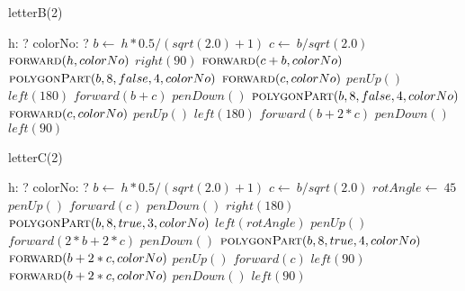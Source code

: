 \documentclass[a4paper,10pt]{article}
\begin{document}
\begin{algorithm}
\caption{letterB(2)}
\begin{algorithmic}[5]
\State {}
\State {}
    \State h: ?
    \State colorNo: ?
  \EndDecl
  \State \(b\gets\ h*0.5/(sqrt(2.0)+1)\)
  \State \(c\gets\ b/sqrt(2.0)\)
  \State \(\Call{forward}{h,colorNo}\)
  \State \(right(90)\)
  \State \(\Call{forward}{c+b,colorNo}\)
  \State \(\Call{polygonPart}{b,8,false,4,colorNo}\)
  \State \(\Call{forward}{c,colorNo}\)
  \State \(penUp()\)
  \State \(left(180)\)
  \State \(forward(b+c)\)
  \State \(penDown()\)
  \State \(\Call{polygonPart}{b,8,false,4,colorNo}\)
  \State \(\Call{forward}{c,colorNo}\)
  \State \(penUp()\)
  \State \(left(180)\)
  \State \(forward(b+2*c)\)
  \State \(penDown()\)
  \State \(left(90)\)
\EndProcedure
\end{algorithmic}
\end{algorithm}


\begin{algorithm}
\caption{letterC(2)}
\begin{algorithmic}[5]
\State {}
\State {}
    \State h: ?
    \State colorNo: ?
  \EndDecl
  \State \(b\gets\ h*0.5/(sqrt(2.0)+1)\)
  \State \(c\gets\ b/sqrt(2.0)\)
  \State \(rotAngle\gets\ 45\)
  \State \(penUp()\)
  \State \(forward(c)\)
  \State \(penDown()\)
  \State \(right(180)\)
  \State {}
  \State {}
  \State \(\Call{polygonPart}{b,8,true,3,colorNo}\)
  \State \(left(rotAngle)\)
  \State \(penUp()\)
  \State \(forward(2*b+2*c)\)
  \State \(penDown()\)
  \State {}
  \State {}
  \State \(\Call{polygonPart}{b,8,true,4,colorNo}\)
  \State \(\Call{forward}{b+2*c,colorNo}\)
  \State \(penUp()\)
  \State \(forward(c)\)
  \State \(left(90)\)
  \State \(\Call{forward}{b+2*c,colorNo}\)
  \State \(penDown()\)
  \State \(left(90)\)
\EndProcedure
\end{algorithmic}
\end{algorithm}
\end{document}
